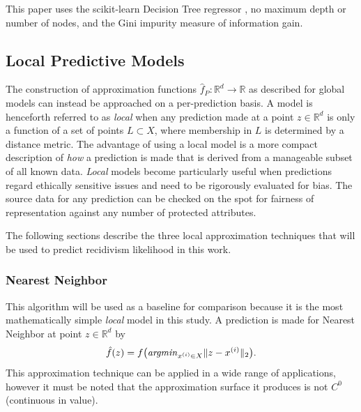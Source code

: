 \documentclass[sigconf]{acmart}
\begin{document}
This paper uses the scikit-learn Decision Tree regressor \cite{scikit-learn}, no maximum depth or number of nodes, and the Gini impurity measure of information gain.

\subsection{Local Predictive Models}

The construction of approximation functions $\hat f_P: \mathbb{R}^d \rightarrow \mathbb{R}$ as described for global models can instead be approached on a per-prediction basis. A model is henceforth referred to as \textit{local} when any prediction made at a point $z \in \mathbb{R}^d$ is only a function of a set of points $L \subset X$, where membership in $L$ is determined by a distance metric. The advantage of using a local model is a more compact description of \textit{how} a prediction is made that is derived from a manageable subset of all known data. \textit{Local} models become particularly useful when predictions regard ethically sensitive issues and need to be rigorously evaluated for bias. The source data for any prediction can be checked on the spot for fairness of representation against any number of protected attributes.

The following sections describe the three local approximation techniques that will be used to predict recidivism likelihood in this work.

\subsubsection{Nearest Neighbor}

This algorithm will be used as a baseline for comparison because it is the most mathematically simple \textit{local} model in this study. A prediction is made for Nearest Neighbor at point $z \in \mathbb{R}^d$ by
$$ \hat f(z) = f \big ( \text{\textit{argmin}}_{x^{(i)} \in X} \| z - x^{(i)} \|_2 \big). $$
This approximation technique can be applied in a wide range of applications, however it must be noted that the approximation surface it produces is not $C^0$ (continuous in value).

\end{document}
